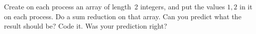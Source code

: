   \label{ex:randomcoord}
  Create on each process an array of length~2 integers, and put the
  values $1,2$ in it on each process. Do a sum reduction on that
  array. Can you predict what the result should be?  Code it. Was your
  prediction right?
